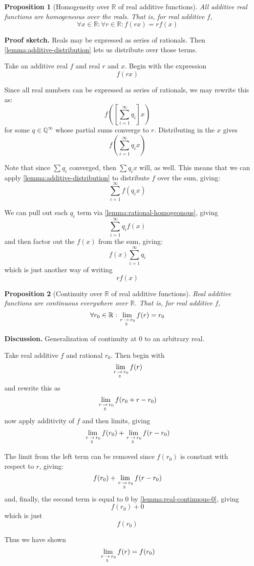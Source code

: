 \documentclass{article}
\theoremstyle{mytheoremstyle}
\newtheorem{proposition}{Proposition}
\renewenvironment{proof}[1][\proofname]{\noindent{\bfseries #1. }}{\begin{flushright}\smiley\end{flushright}}
\newcommand{\discussion}{\noindent\textbf{Discussion.} }
\newcommand{\sketch}{\noindent\textbf{Proof sketch.} }
\newcommand{\R}{\mathbb R}
\begin{document}

\begin{proposition}[Homogeneity over $\mathbb R$ of real additive functions]
\label{lemma:real-homogenous}
All additive real functions are homogeneous over the reals. That is, for real additive $f$,
$$ \forall x \in \mathbb R: \forall r \in \mathbb R : f(rx) = rf(x) $$
\end{proposition}

\sketch Reals may be expressed as series of rationals. Then \cref{lemma:additive-distribution} lets us distribute over those terms.

\begin{proof}
Take an additive real $f$ and real $r$ and $x$. Begin with the expression
$$ f(rx) $$

Since all real numbers can be expressed as series of rationals, we may rewrite this as:
$$ f\left(\left[\sum_{i=1}^\infty q_i\right] x\right) $$
for some $q \in \mathbb Q ^\infty$ whose partial sums converge to $r$. Distributing in the $x$ gives
$$ f\left(\sum_{i=1}^\infty q_i x\right) $$

Note that since $\sum q_i$ converged, then $\sum q_ix$ will, as well. This means that we can apply \cref{lemma:additive-distribution} to distribute $f$ over the sum, giving:
$$ \sum_{i=1}^\infty f(q_i x) $$

We can pull out each $q_i$ term via \cref{lemma:rational-homogeonous}, giving
$$ \sum_{i=1}^\infty q_if(x) $$
and then factor out the $f(x)$ from the sum, giving:
$$ f(x)\sum_{i=1}^\infty q_i $$
which is just another way of writing
$$ rf(x) $$

\end{proof}


\begin{proposition}[Continuity over $\mathbb R$ of real additive functions]
\label{lemma:real-continuous}
Real additive functions are continuous everywhere over $\mathbb R$. That is, for real additive $f$,
$$ \forall r_0 \in \mathbb R : \limx{\R}{r}{r_0} f(r) = r_0 $$
\end{proposition}

\discussion Generalization of continuity at 0 to an arbitrary real.

\begin{proof}
Take real additive $f$ and rational $r_0$. Then begin with
$$ \limx{\R}{r}{r_0} f(r) $$
and rewrite this as
$$ \limx{\R}{r}{r_0} f(r_0 + r - r_0) $$
now apply additivity of $f$ and then limits, giving
$$ \limx{\R}{r}{r_0} f(r_0) + \limx{\R}{r}{r_0} f(r - r_0) $$

The limit from the left term can be removed since $f(r_0)$ is constant with respect to $r$, giving:
$$ f(r_0) + \limx{\R}{r}{r_0} f(r - r_0) $$
and, finally, the second term is equal to 0 by \cref{lemma:real-continuous-0}, giving
$$ f(r_0) + 0 $$
which is just
$$ f(r_0) $$

Thus we have shown
$$ \limx{\R}{r}{r_0} f(r) = f(r_0) $$

\end{proof}
\end{document}
